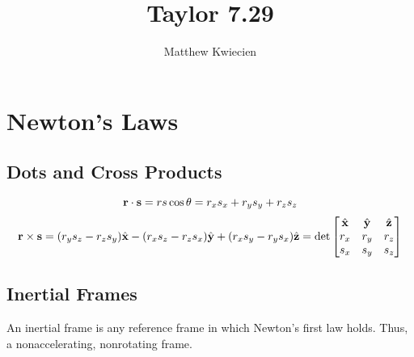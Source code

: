 \documentclass{article}
\title{Taylor 7.29}
\author{Matthew Kwiecien}
\newcommand{\vh}[1]{\hat{\vb{#1}}}
\begin{document}
\maketitle

\section{Newton's Laws}
\subsection{Dots and Cross Products}
\begin{equation*}
   \vb{r} \cdot \vb{s} = rs\cos\theta = r_{x}s_{x}+r_{y}s_{y}+r_{z}s_{z}
\end{equation*}
\begin{equation*}
   \vb{r} \times \vb{s} =  (r_{y}s_{z}-r_{z}s_{y})\vh{x} - (r_{x}s_{z}-r_{z}s_{x})\vh{y} + 
   (r_{x}s_{y}-r_{y}s_{x})\vh{z} = 
   \det 
\begin{bmatrix}
    \vh{x} & \vh{y} & \vh{z} \\
    r_{x} & r_{y} & r_{z} \\
    s_{x} & s_{y} & s_{z} \\
\end{bmatrix}
\end{equation*}

\subsection{Inertial Frames}
An inertial frame is any reference frame in which Newton's first law holds.  Thus, a nonaccelerating, nonrotating frame.
\end{document}
